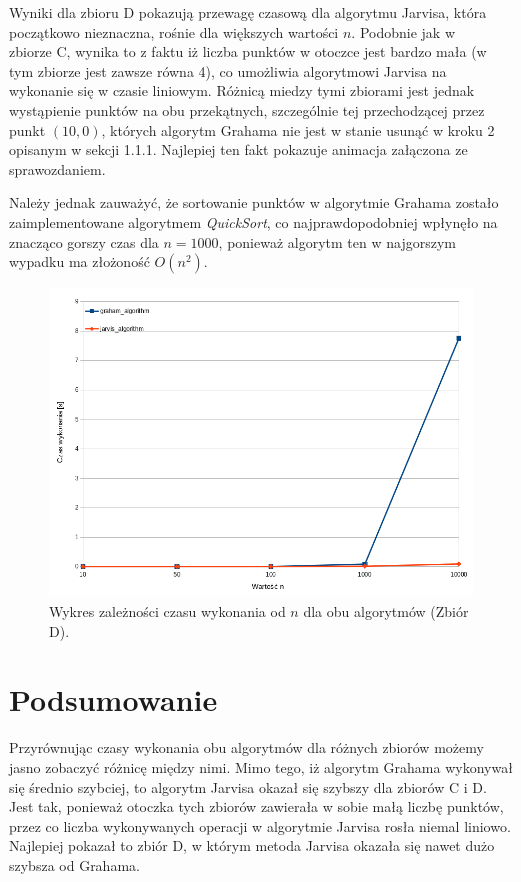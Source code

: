 \documentclass[11pt,a4paper]{article}
\begin{document}
Wyniki dla zbioru D pokazują przewagę czasową dla algorytmu
Jarvisa, która początkowo nieznaczna, rośnie dla większych wartości $n$.
Podobnie jak w \\zbiorze C, wynika to z faktu iż liczba punktów
w otoczce jest bardzo mała (w tym zbiorze jest zawsze równa 4), co
umożliwia algorytmowi Jarvisa na wykonanie się w czasie liniowym.
Różnicą miedzy tymi zbiorami jest jednak wystąpienie punktów na 
obu przekątnych, szczególnie tej przechodzącej przez punkt $(10,0)$, 
których algorytm Grahama nie jest w stanie usunąć w kroku 2 opisanym
w sekcji 1.1.1. Najlepiej ten fakt pokazuje animacja załączona
ze sprawozdaniem.

Należy jednak zauważyć, że sortowanie punktów w algorytmie Grahama
zostało zaimplementowane algorytmem \textit{QuickSort}, co najprawdopodobniej
wpłynęło na znacząco gorszy czas dla $n = 1000$, ponieważ algorytm ten w 
najgorszym wypadku ma złożoność $O(n^2)$.

\begin{figure}[H]
    \centering
    \includegraphics[scale=0.6]{res/wykres_d.png}
    \caption{Wykres zależności czasu wykonania 
    od $n$ dla obu algorytmów (Zbiór D).}
\end{figure}

\section{Podsumowanie}
Przyrównując czasy wykonania obu algorytmów dla różnych zbiorów
możemy jasno zobaczyć różnicę między nimi. Mimo tego, iż algorytm Grahama
wykonywał się średnio szybciej, to algorytm Jarvisa okazał się szybszy
dla zbiorów C i D. Jest tak, ponieważ otoczka tych zbiorów zawierała
w sobie małą liczbę punktów, przez co liczba wykonywanych operacji
w algorytmie Jarvisa rosła niemal liniowo. Najlepiej pokazał to zbiór D,
w którym metoda Jarvisa okazała się nawet dużo szybsza od Grahama.
\end{document}
